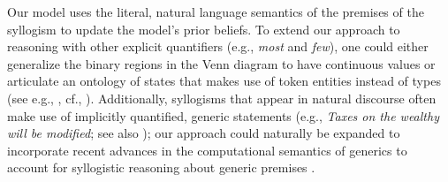 \documentclass[floatsintext, man]{apa6}
\begin{document}
Our model uses the literal, natural language semantics of the premises of the syllogism to update the model's prior beliefs. 
To extend our approach to reasoning with other explicit quantifiers (e.g., \emph{most} and \emph{few}), one could either generalize the binary regions in the Venn diagram to have continuous values or articulate an ontology of states that makes use of token entities instead of types (see e.g., , cf., ).
Additionally, syllogisms that appear in natural discourse often make use of implicitly quantified, generic statements (e.g., \emph{Taxes on the wealthy will be modified}; see also ); our approach could naturally be expanded to incorporate recent advances in the computational semantics of generics to account for syllogistic reasoning about generic premises \cite{tessler2019language}. 
\end{document}
